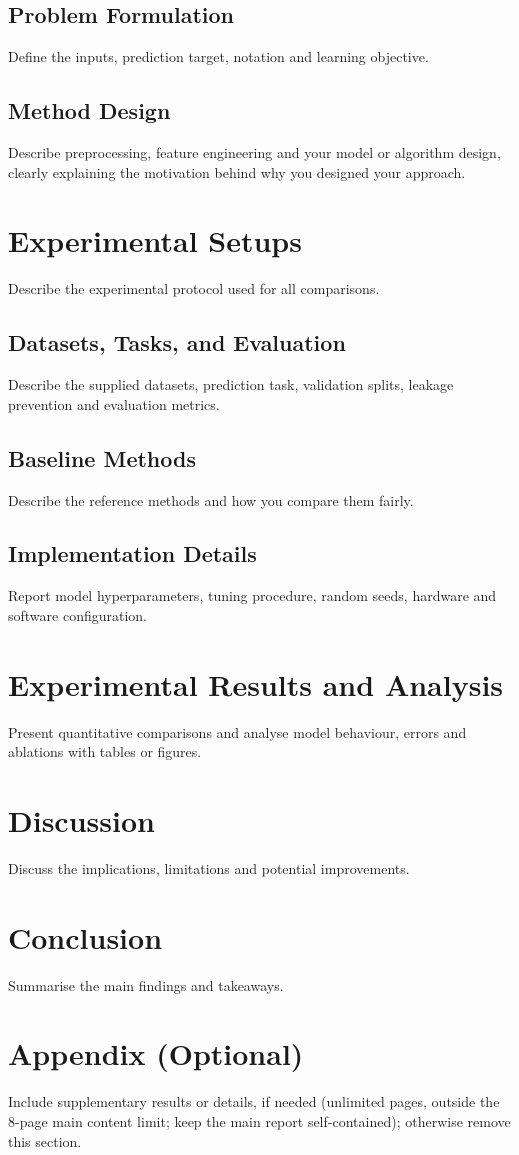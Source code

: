 \subsection{Problem Formulation}
Define the inputs, prediction target, notation and learning objective.

\subsection{Method Design}
Describe preprocessing, feature engineering and your model or algorithm design, clearly explaining the motivation behind why you designed your approach.

\section{Experimental Setups}
Describe the experimental protocol used for all comparisons.

\subsection{Datasets, Tasks, and Evaluation}
Describe the supplied datasets, prediction task, validation splits, leakage prevention and evaluation metrics.

\subsection{Baseline Methods}
Describe the reference methods and how you compare them fairly.

\subsection{Implementation Details}
Report model hyperparameters, tuning procedure, random seeds, hardware and software configuration.

\section{Experimental Results and Analysis}
Present quantitative comparisons and analyse model behaviour, errors and ablations with tables or figures.

\section{Discussion}
Discuss the implications, limitations and potential improvements.

\section{Conclusion}
Summarise the main findings and takeaways.




\section*{Appendix (Optional)}
Include supplementary results or details, if needed (unlimited pages, outside the 8-page main content limit; keep the main report self-contained); otherwise remove this section.


